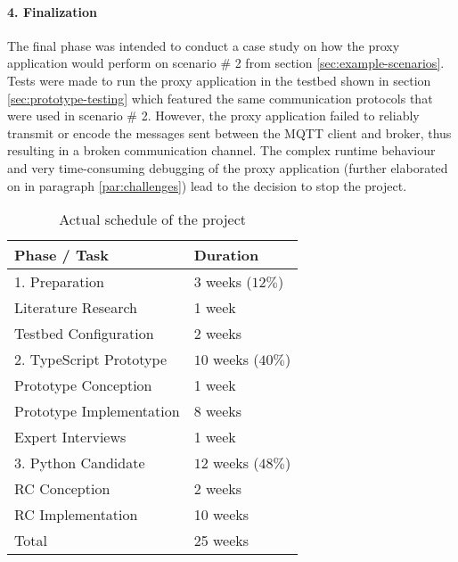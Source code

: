 \paragraph{4. Finalization} The final phase was intended to conduct a case study on how the proxy application would perform on scenario \# 2 from section \ref{sec:example-scenarios}. Tests were made to run the proxy application in the testbed shown in section \ref{sec:prototype-testing} which featured the same communication protocols that were used in scenario \# 2. However, the proxy application failed to reliably transmit or encode the messages sent between the \ac{MQTT} client and broker, thus resulting in a broken communication channel. The complex runtime behaviour and very time-consuming debugging of the proxy application (further elaborated on in paragraph \ref{par:challenges}) lead to the decision to stop the project.

\begin{table}
    \centering
    \begin{tabular}{l l}
        \toprule
        Phase / Task             & Duration            \\
        \midrule
        1. Preparation           & $3$ weeks ($12\%$)  \\
        \midrule
        Literature Research      & 1 week              \\
        Testbed Configuration    & 2 weeks             \\
        \midrule
        2. TypeScript Prototype  & $10$ weeks ($40\%$) \\
        \midrule
        Prototype Conception     & 1 week              \\
        Prototype Implementation & 8 weeks             \\
        Expert Interviews        & 1 week              \\
        \midrule
        3. Python Candidate      & $12$ weeks ($48\%$) \\
        \midrule
        RC Conception            & 2 weeks             \\
        RC Implementation        & 10 weeks            \\
        \midrule
        \midrule
        Total                    & 25 weeks            \\
        \bottomrule
    \end{tabular}
    \caption{Actual schedule of the project}
    \label{fig:thesis-schedule-actual}
\end{table}

